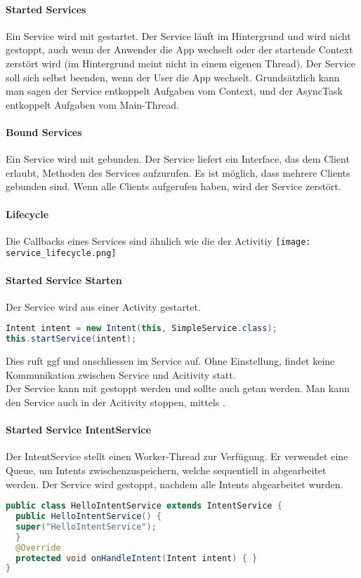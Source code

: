 \paragraph{Started Services} Ein Service wird mit  gestartet. Der Service läuft im Hintergrund und wird nicht gestoppt, auch wenn der Anwender die App wechselt oder der startende Context zerstört wird (im Hintergrund meint nicht in einem eigenen Thread). Der Service soll sich selbst beenden, wenn der User die App wechselt. Grundsätzlich kann man sagen der Service entkoppelt Aufgaben vom Context, und der AsyncTask entkoppelt Aufgaben vom Main-Thread.
\paragraph{Bound Services} Ein Service wird mit  gebunden. Der Service liefert ein Interface, das dem Client erlaubt, Methoden des Services aufzurufen. Es ist möglich, dass mehrere Clients gebunden sind. Wenn alle Clients  aufgerufen haben, wird der Service zerstört.
\paragraph{Lifecycle} Die Callbacks eines Services sind ähnlich wie die der Activitiy
\texttt{[image: service\_lifecycle.png]}
\paragraph{Started Service Starten} Der Service wird aus einer Activity gestartet.
\begin{lstlisting}[language=java]
Intent intent = new Intent(this, SimpleService.class);
this.startService(intent);
\end{lstlisting}
Dies ruft ggf  und anschliessen  im Service auf. Ohne Einstellung, findet keine Kommunikation zwischen Service und Acitivity statt.\\
Der Service kann mit  gestoppt werden und sollte auch getan werden. Man kann den Service auch in der Acitivity stoppen, mittels .
\paragraph{Started Service IntentService} Der IntentService stellt einen Worker-Thread zur Verfügung. Er verwendet eine Queue, um Intents zwischenzuspeichern, welche sequentiell in  abgearbeitet werden. Der Service wird gestoppt, nachdem alle Intents abgearbeitet wurden.
\begin{lstlisting}[language=java]
public class HelloIntentService extends IntentService {
  public HelloIntentService() {
  super("HelloIntentService");
  }
  @Override
  protected void onHandleIntent(Intent intent) { }
}
\end{lstlisting}

